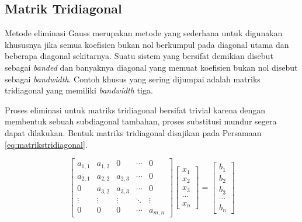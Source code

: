 \documentclass[]{book}
\theoremstyle{definition}
\theoremstyle{definition}
\theoremstyle{definition}
\theoremstyle{remark}
\begin{document}
\hypertarget{matriktridiagonal}{%
\subsection{Matrik Tridiagonal}\label{matriktridiagonal}}

Metode eliminasi Gauss merupakan metode yang sederhana untuk digunakan khususnya jika semua koefisien bukan nol berkumpul pada diagonal utama dan beberapa diagonal sekitarnya. Suatu sistem yang bersifat demikian disebut sebagai \emph{banded} dan banyaknya diagonal yang memuat koefisien bukan nol disebut sebagai \emph{bandwidth}. Contoh khusus yang sering dijumpai adalah matriks tridiagonal yang memiliki \emph{bandwidth} tiga.

Proses eliminasi untuk matriks tridiagonal bersifat trivial karena dengan membentuk sebuah subdiagonal tambahan, proses substitusi mundur segera dapat dilakukan. Bentuk matriks tridiagonal disajikan pada Persamaan \eqref{eq:matrikstridiagonal}.

\begin{equation}
\begin{bmatrix}
     a_{1,1} & a_{1,2} & 0       &\cdots& 0                 \\[0.3em]
     a_{2,1} & a_{2,2} & a_{2,3} &\cdots& 0             \\[0.3em]
     0       & a_{3,2} & a_{3,3} &\cdots& 0             \\[0.3em]
     \vdots  & \vdots  & \vdots  &\ddots& \vdots            \\[0.3em]
     0       & 0       & 0       &\cdots& a_{m,n}
     \end{bmatrix}
\begin{bmatrix}
     x_1                                          \\[0.3em]
     x_2                                          \\[0.3em]
     x_3                                          \\[0.3em]
     \cdots                                       \\[0.3em]
     x_n                                       
     \end{bmatrix}
= \begin{bmatrix}
     b_1                                          \\[0.3em]
     b_2                                          \\[0.3em]
     b_3                                          \\[0.3em]
     \cdots                                       \\[0.3em]
     b_n                                       
     \end{bmatrix}
  \label{eq:matrikstridiagonal}
\end{equation}
\end{document}
